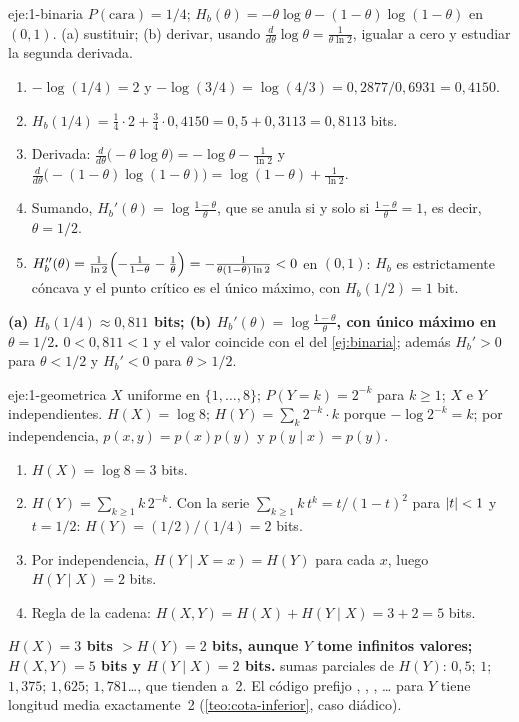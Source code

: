 \begin{solucion}{eje:1-binaria}
\datos $P(\text{cara})=1/4$; $H_b(\theta)=-\theta\log\theta-(1-\theta)\log(1-\theta)$ en $(0,1)$.
\planteamiento (a) sustituir; (b) derivar, usando $\frac{d}{d\theta}\log\theta=\frac{1}{\theta\ln 2}$, igualar a cero y estudiar la segunda derivada.
\pasos
\begin{enumerate}[label=\arabic*.]
  \item $-\log(1/4)=2$ y $-\log(3/4)=\log(4/3)=0{,}2877/0{,}6931=0{,}4150$.
  \item $H_b(1/4)=\tfrac14\cdot 2+\tfrac34\cdot 0{,}4150=0{,}5+0{,}3113=0{,}8113$ bits.
  \item Derivada: $\frac{d}{d\theta}\bigl(-\theta\log\theta\bigr)=-\log\theta-\frac{1}{\ln 2}$ y $\frac{d}{d\theta}\bigl(-(1-\theta)\log(1-\theta)\bigr)=\log(1-\theta)+\frac{1}{\ln 2}$.
  \item Sumando, $H_b'(\theta)=\log\frac{1-\theta}{\theta}$, que se anula si y solo si $\frac{1-\theta}{\theta}=1$, es decir, $\theta=1/2$.
  \item $H_b''(\theta)=\frac{1}{\ln 2}\Bigl(-\frac{1}{1-\theta}-\frac{1}{\theta}\Bigr)=-\frac{1}{\theta(1-\theta)\ln 2}<0$ en $(0,1)$: $H_b$ es estrictamente cóncava y el punto crítico es el único máximo, con $H_b(1/2)=1$ bit.
\end{enumerate}
\resultado \textbf{(a) $H_b(1/4)\approx 0{,}811$ bits; (b) $H_b'(\theta)=\log\frac{1-\theta}{\theta}$, con único máximo en $\theta=1/2$.}
\comprobacion $0<0{,}811<1$ y el valor coincide con el del \cref{ej:binaria}; además $H_b'>0$ para $\theta<1/2$ y $H_b'<0$ para $\theta>1/2$.
\end{solucion}

\begin{solucion}{eje:1-geometrica}
\datos $X$ uniforme en $\{1,\dots,8\}$; $P(Y=k)=2^{-k}$ para $k\ge 1$; $X$ e $Y$ independientes.
\planteamiento $H(X)=\log 8$; $H(Y)=\sum_k2^{-k}\cdot k$ porque $-\log2^{-k}=k$; por independencia, $p(x,y)=p(x)p(y)$ y $p(y\mid x)=p(y)$.
\pasos
\begin{enumerate}[label=\arabic*.]
  \item $H(X)=\log 8=3$ bits.
  \item $H(Y)=\sum_{k\ge 1}k\,2^{-k}$. Con la serie $\sum_{k\ge1}k\,t^{k}=t/(1-t)^{2}$ para $\lvert t\rvert<1$ y $t=1/2$: $H(Y)=(1/2)/(1/4)=2$ bits.
  \item Por independencia, $H(Y\mid X=x)=H(Y)$ para cada $x$, luego $H(Y\mid X)=2$ bits.
  \item Regla de la cadena: $H(X,Y)=H(X)+H(Y\mid X)=3+2=5$ bits.
\end{enumerate}
\resultado \textbf{$H(X)=3$ bits $>H(Y)=2$ bits, aunque $Y$ tome infinitos valores; $H(X,Y)=5$ bits y $H(Y\mid X)=2$ bits.}
\comprobacion sumas parciales de $H(Y)$: $0{,}5$; $1$; $1{,}375$; $1{,}625$; $1{,}781$\ldots, que tienden a~2. El código prefijo , , , \ldots{} para $Y$ tiene longitud media exactamente~2 (\cref{teo:cota-inferior}, caso diádico).
\end{solucion}

